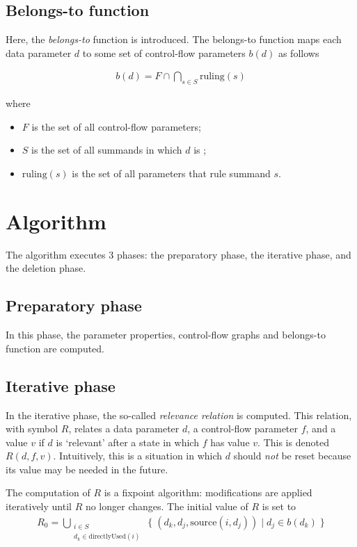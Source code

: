 \subsection{Belongs-to function}

Here, the \emph{belongs-to} function is introduced.
The belongs-to function maps each data parameter $d$ to some set of control-flow parameters $b(d)$ as follows

\begin{align*}
b(d) = F \cap \bigcap\limits_{s \in S}^{} \text{ruling}(s)
\end{align*}

where

\begin{itemize}
\item $F$ is the set of all control-flow parameters;
\item $S$ is the set of all summands in which $d$ is ;
\item $\text{ruling}(s)$ is the set of all parameters that rule summand $s$.
\end{itemize}

\section{Algorithm}

The algorithm executes 3 phases: the preparatory phase, the iterative phase, and the deletion phase.

\subsection{Preparatory phase}

In this phase, the parameter properties, control-flow graphs and belongs-to function are computed.

\subsection{Iterative phase}

In the iterative phase, the so-called \emph{relevance relation} is computed.
This relation, with symbol $R$, relates a data parameter $d$, a control-flow parameter $f$, and a value $v$ if $d$ is `relevant' after a state in which $f$ has value $v$.
This is denoted $R(d, f, v)$.
Intuitively, this is a situation in which $d$ should \emph{not} be reset because its value may be needed in the future.

The computation of $R$ is a fixpoint algorithm: modifications are applied iteratively until $R$ no longer changes.
The initial value of $R$ is set to
\begin{align*}
R_0 = \bigcup\limits_{\substack{i \in S \\ d_k \in \text{directlyUsed}(i)}}^{} \;\{\; (d_k, d_j, \text{source}(i, d_j)) \;|\; d_j \in b(d_k) \;\}
\end{align*}

